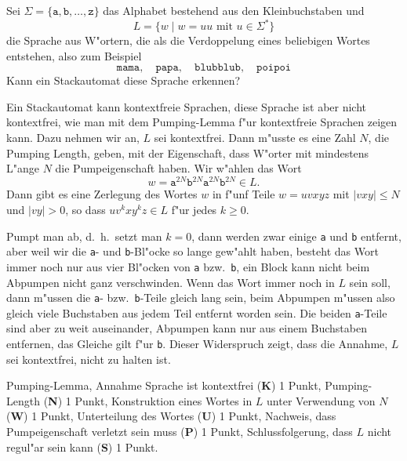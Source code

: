 Sei $\Sigma=\{\texttt{a},\texttt{b},\dots,\texttt{z}\}$ das Alphabet
bestehend aus den Kleinbuchstaben und 
\[
L=\{ w\;|\; \text{$w=uu$ mit $u\in\Sigma^*$}\}
\]
die Sprache aus W"ortern, die als die Verdoppelung eines beliebigen
Wortes entstehen, also zum Beispiel
\[
\texttt{mama},\quad
\texttt{papa},\quad
\texttt{blubblub},\quad
\texttt{poipoi}
\]
Kann ein Stackautomat diese Sprache erkennen?





\begin{loesung}
Ein Stackautomat kann kontextfreie Sprachen, diese Sprache ist aber nicht
kontextfrei, wie man mit dem Pumping-Lemma f"ur kontextfreie
Sprachen zeigen kann.
Dazu nehmen wir an, $L$ sei kontextfrei.
Dann m"usste es eine Zahl $N$, die Pumping Length, geben, mit der Eigenschaft,
dass W"orter mit mindestens L"ange $N$ die Pumpeigenschaft haben.
Wir w"ahlen das Wort
\[
w=
\texttt{a}^{2N}
\texttt{b}^{2N}
\texttt{a}^{2N}
\texttt{b}^{2N}
\in L.
\]
Dann gibt es eine Zerlegung des Wortes $w$ in f"unf Teile $w=uvxyz$ mit
$|vxy|\le N$ und $|vy|>0$, so dass $uv^kxy^kz\in L$ f"ur jedes $k\ge 0$.

Pumpt man ab, d.~h.~setzt man $k=0$, dann werden zwar einige \texttt{a}
und \texttt{b} entfernt, aber weil wir die \texttt{a}- und \texttt{b}-Bl"ocke
so lange gew"ahlt haben, besteht das Wort immer noch nur aus
vier Bl"ocken von \texttt{a} bzw.~\texttt{b}, ein Block kann nicht beim
Abpumpen nicht ganz verschwinden.
Wenn das Wort immer noch in $L$ sein soll, dann m"ussen die \texttt{a}-
bzw.~\texttt{b}-Teile gleich lang sein, beim Abpumpen m"ussen also
gleich viele Buchstaben aus jedem Teil entfernt worden sein.
Die beiden \texttt{a}-Teile sind aber zu weit auseinander, Abpumpen
kann nur aus einem Buchstaben entfernen, das Gleiche gilt f"ur \texttt{b}.
Dieser Widerspruch zeigt, dass die Annahme, $L$ sei kontextfrei, nicht
zu halten ist.
\end{loesung}

\begin{bewertung}
Pumping-Lemma, Annahme Sprache ist kontextfrei ({\bf K}) 1 Punkt,
Pumping-Length ({\bf N}) 1 Punkt,
Konstruktion eines Wortes in $L$ unter Verwendung von $N$ ({\bf W}) 1 Punkt,
Unterteilung des Wortes ({\bf U}) 1 Punkt,
Nachweis, dass Pumpeigenschaft verletzt sein muss ({\bf P}) 1 Punkt,
Schlussfolgerung, dass $L$ nicht regul"ar sein kann ({\bf S}) 1 Punkt.
\end{bewertung}




